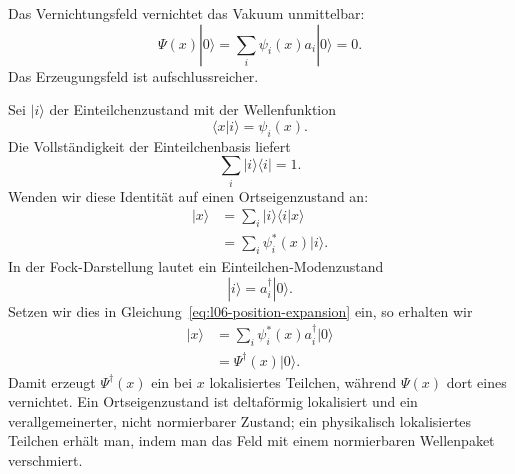Das Vernichtungsfeld vernichtet das Vakuum unmittelbar:
\begin{equation}
\Psi(x)|0\rangle
=\sum_i\psi_i(x)a_i|0\rangle
=0.
\label{eq:l06-field-kills-vacuum}
\end{equation}
Das Erzeugungsfeld ist aufschlussreicher.

Sei \(|i\rangle\) der Einteilchenzustand mit der Wellenfunktion
\begin{equation}
\langle x|i\rangle=\psi_i(x).
\end{equation}
Die Vollständigkeit der Einteilchenbasis liefert
\begin{equation}
\sum_i|i\rangle\langle i|=1.
\label{eq:l06-completeness}
\end{equation}
Wenden wir diese Identität auf einen Ortseigenzustand an:
\begin{align}
|x\rangle
&=\sum_i|i\rangle\langle i|x\rangle \\
&=\sum_i\psi_i^*(x)|i\rangle.
\label{eq:l06-position-expansion}
\end{align}
In der Fock-Darstellung lautet ein Einteilchen-Modenzustand
\begin{equation}
|i\rangle=a_i^\dagger|0\rangle.
\end{equation}
Setzen wir dies in Gleichung~\eqref{eq:l06-position-expansion} ein, so erhalten wir
\begin{align}
|x\rangle
&=\sum_i\psi_i^*(x)a_i^\dagger|0\rangle \\
&=\Psi^\dagger(x)|0\rangle.
\label{eq:l06-local-creation}
\end{align}
Damit erzeugt \(\Psi^\dagger(x)\) ein bei \(x\) lokalisiertes Teilchen, während \(\Psi(x)\) dort eines vernichtet. Ein Ortseigenzustand ist deltaförmig lokalisiert und ein verallgemeinerter, nicht normierbarer Zustand; ein physikalisch lokalisiertes Teilchen erhält man, indem man das Feld mit einem normierbaren Wellenpaket verschmiert.

\begin{classroomqa}
\end{classroomqa}

